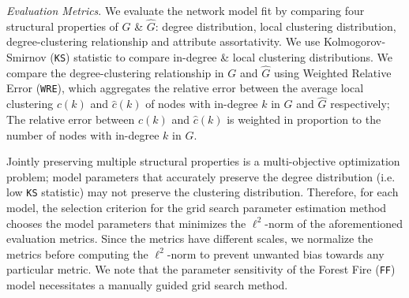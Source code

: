 \textit{Evaluation Metrics}.
We evaluate the network model fit by comparing four structural properties of ${G}$ \& $\hat{G}$:
degree distribution, local clustering distribution, degree-clustering relationship
and attribute assortativity. We use Kolmogorov-Smirnov (\texttt{KS}) statistic to compare in-degree
\& local clustering distributions. We compare the degree-clustering relationship in $G$ and $\hat{G}$ using
Weighted Relative Error (\texttt{WRE}), which aggregates the relative error
between the average local clustering $c(k)$ and $\hat{c}(k)$ of nodes with in-degree $k$
in $G$ and $\hat{G}$ respectively; The relative error between $c(k)$ and $\hat{c}(k)$
is weighted in proportion to the number of nodes with in-degree $k$ in $G$.

Jointly preserving multiple structural properties is a multi-objective optimization
problem; model parameters that accurately preserve the degree distribution
(i.e. low \texttt{KS} statistic) may not preserve the clustering distribution.
Therefore, for each model, the selection criterion for the grid search parameter estimation method
chooses the model parameters that minimizes the $\ell^2$-norm of the aforementioned evaluation metrics.
Since the metrics have different scales, we normalize the metrics before computing the $\ell^2$-norm
to prevent unwanted bias towards any particular metric.
We note that the parameter sensitivity of the Forest Fire (\texttt{FF}) model necessitates
a manually guided grid search method.


